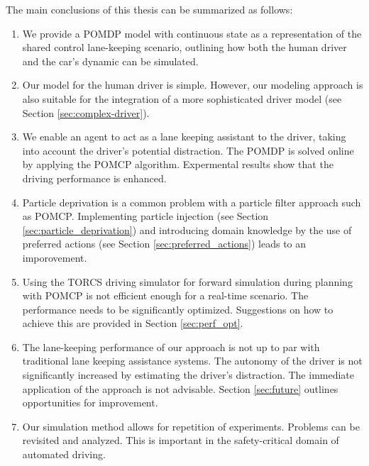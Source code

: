 \vspace{1em}
\noindent
The main conclusions of this thesis can be summarized as follows:
\begin{enumerate}
    \item We provide a POMDP model with continuous state as a representation of the shared control lane-keeping scenario, outlining how both the human driver and the car's dynamic can be simulated. 
    \item Our model for the human driver is simple. However, our modeling approach is also suitable for the integration of a more sophisticated driver model (see Section \ref{sec:complex-driver}).
    \item We enable an agent to act as a lane keeping assistant to the driver, taking into account the driver's potential distraction. The POMDP is solved online by applying the POMCP algorithm. Expermental results show that the driving performance is enhanced.
    \item Particle deprivation is a common problem with a particle filter approach such as POMCP. Implementing particle injection (see Section \ref{sec:particle_deprivation}) and introducing domain knowledge by the use of preferred actions (see Section \ref{sec:preferred_actions}) leads to an imporovement.
    \item Using the TORCS driving simulator for forward simulation during planning with POMCP is not efficient enough for a real-time scenario. The performance needs to be significantly optimized. Suggestions on how to achieve this are provided in Section \ref{sec:perf_opt}.
    \item The lane-keeping performance of our approach is not up to par with traditional lane keeping assistance systems. The autonomy of the driver is not significantly increased by estimating the driver's distraction. The immediate application of the approach is not advisable. Section \ref{sec:future} outlines opportunities for improvement.
    \item Our simulation method allows for repetition of experiments. Problems can be revisited and analyzed. This is important in the safety-critical domain of automated driving.
\end{enumerate}




